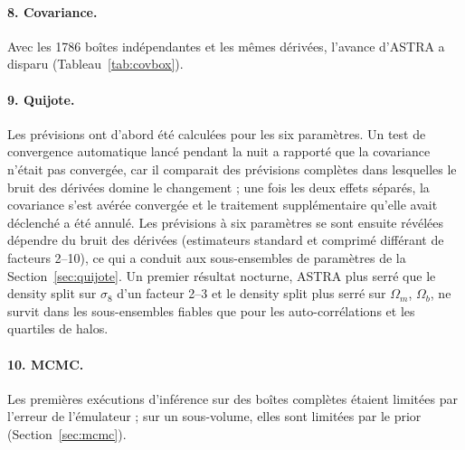 \documentclass[11pt,twocolumn]{article}
\begin{document}
\paragraph{8. Covariance.} Avec les 1786 boîtes indépendantes et les mêmes dérivées, l'avance d'ASTRA a disparu (Tableau~\ref{tab:covbox}).

\paragraph{9. Quijote.} Les prévisions ont d'abord été calculées pour les six paramètres. Un test de convergence automatique lancé pendant la nuit a rapporté que la covariance n'était pas convergée, car il comparait des prévisions complètes dans lesquelles le bruit des dérivées domine le changement ; une fois les deux effets séparés, la covariance s'est avérée convergée et le traitement supplémentaire qu'elle avait déclenché a été annulé. Les prévisions à six paramètres se sont ensuite révélées dépendre du bruit des dérivées (estimateurs standard et comprimé différant de facteurs 2--10), ce qui a conduit aux sous-ensembles de paramètres de la Section~\ref{sec:quijote}. Un premier résultat nocturne, ASTRA plus serré que le density split sur $\sigma_8$ d'un facteur 2--3 et le density split plus serré sur $\Omega_m$, $\Omega_b$, ne survit dans les sous-ensembles fiables que pour les auto-corrélations et les quartiles de halos.

\paragraph{10. MCMC.} Les premières exécutions d'inférence sur des boîtes complètes étaient limitées par l'erreur de l'émulateur ; sur un sous-volume, elles sont limitées par le prior (Section~\ref{sec:mcmc}).
\end{document}
